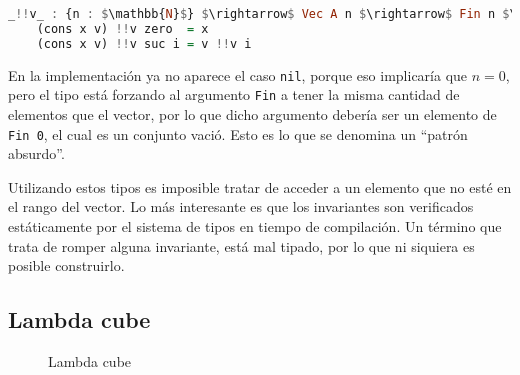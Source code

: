 \documentclass[]{report}
\begin{document}
	\begin{lstlisting}[mathescape, language=Haskell]
	_!!v_ : {n : $\mathbb{N}$} $\rightarrow$ Vec A n $\rightarrow$ Fin n $\rightarrow$ A
	(cons x v) !!v zero  = x
	(cons x v) !!v suc i = v !!v i
	\end{lstlisting}
	
	En la implementación ya no aparece el caso \verb|nil|, porque eso implicaría que $n = 0$, pero el tipo está forzando al argumento \verb|Fin| a tener la misma cantidad de elementos que el vector, por lo que dicho argumento debería ser un elemento de \verb|Fin 0|, el cual es un conjunto vació. Esto es lo que se denomina un ``patrón absurdo''.
	
	Utilizando estos tipos es imposible tratar de acceder a un elemento que no esté en el rango del vector.
	Lo más interesante es que los invariantes son verificados estáticamente por el sistema de tipos en tiempo de compilación. Un término que trata de romper alguna invariante, está mal tipado, por lo que ni siquiera es posible construirlo.
		
	
	\subsection{Lambda cube}
	
	\begin{figure}[h!]
		\centering
	\caption{Lambda cube}
	\end{figure}
	
\end{document}
